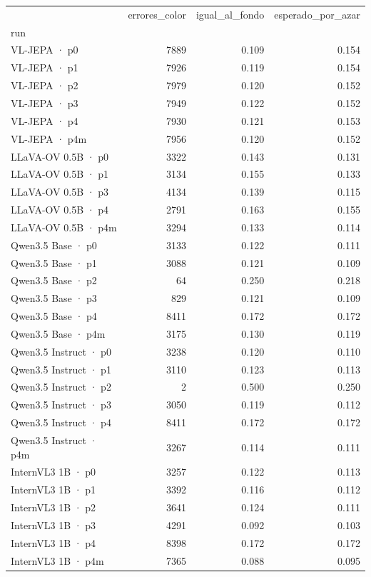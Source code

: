 \begin{tabular}{lrrr}
\toprule
 & errores\_color & igual\_al\_fondo & esperado\_por\_azar \\
run &  &  &  \\
\midrule
VL-JEPA · p0 & 7889 & 0.109 & 0.154 \\
VL-JEPA · p1 & 7926 & 0.119 & 0.154 \\
VL-JEPA · p2 & 7979 & 0.120 & 0.152 \\
VL-JEPA · p3 & 7949 & 0.122 & 0.152 \\
VL-JEPA · p4 & 7930 & 0.121 & 0.153 \\
VL-JEPA · p4m & 7956 & 0.120 & 0.152 \\
LLaVA-OV 0.5B · p0 & 3322 & 0.143 & 0.131 \\
LLaVA-OV 0.5B · p1 & 3134 & 0.155 & 0.133 \\
LLaVA-OV 0.5B · p3 & 4134 & 0.139 & 0.115 \\
LLaVA-OV 0.5B · p4 & 2791 & 0.163 & 0.155 \\
LLaVA-OV 0.5B · p4m & 3294 & 0.133 & 0.114 \\
Qwen3.5 Base · p0 & 3133 & 0.122 & 0.111 \\
Qwen3.5 Base · p1 & 3088 & 0.121 & 0.109 \\
Qwen3.5 Base · p2 & 64 & 0.250 & 0.218 \\
Qwen3.5 Base · p3 & 829 & 0.121 & 0.109 \\
Qwen3.5 Base · p4 & 8411 & 0.172 & 0.172 \\
Qwen3.5 Base · p4m & 3175 & 0.130 & 0.119 \\
Qwen3.5 Instruct · p0 & 3238 & 0.120 & 0.110 \\
Qwen3.5 Instruct · p1 & 3110 & 0.123 & 0.113 \\
Qwen3.5 Instruct · p2 & 2 & 0.500 & 0.250 \\
Qwen3.5 Instruct · p3 & 3050 & 0.119 & 0.112 \\
Qwen3.5 Instruct · p4 & 8411 & 0.172 & 0.172 \\
Qwen3.5 Instruct · p4m & 3267 & 0.114 & 0.111 \\
InternVL3 1B · p0 & 3257 & 0.122 & 0.113 \\
InternVL3 1B · p1 & 3392 & 0.116 & 0.112 \\
InternVL3 1B · p2 & 3641 & 0.124 & 0.111 \\
InternVL3 1B · p3 & 4291 & 0.092 & 0.103 \\
InternVL3 1B · p4 & 8398 & 0.172 & 0.172 \\
InternVL3 1B · p4m & 7365 & 0.088 & 0.095 \\
\bottomrule
\end{tabular}
